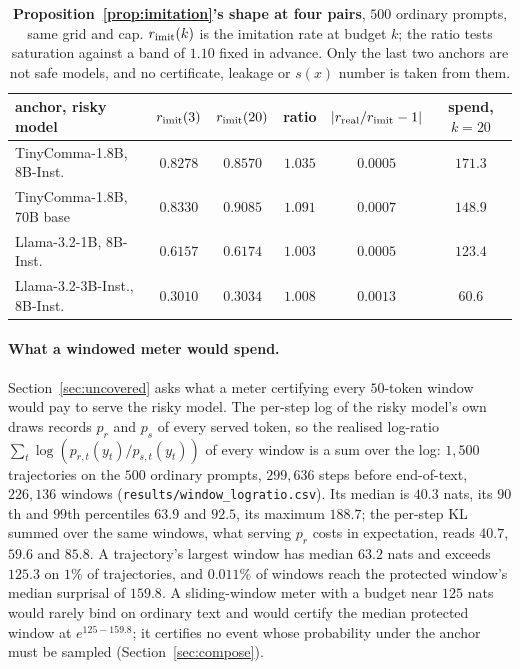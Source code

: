 \begin{table}[h]
\centering\footnotesize
\caption{\textbf{Proposition~\ref{prop:imitation}'s shape at four pairs}, $500$ ordinary prompts, same grid
and cap. $r_{\rm imit}(k)$ is the imitation rate at budget $k$; the ratio tests saturation against a band
of $1.10$ fixed in advance. Only the last two anchors are not safe models, and no certificate, leakage or
$s(x)$ number is taken from them.}
\label{tab:imitation-pairs}
\setlength{\tabcolsep}{4pt}
\begin{tabular}{@{}lccccc@{}}
\toprule
anchor, risky model & $r_{\rm imit}(3)$ & $r_{\rm imit}(20)$ & ratio & $|r_{\rm real}/r_{\rm imit}-1|$ & spend, $k{=}20$ \\
\midrule
TinyComma-1.8B, 8B-Inst.  & $0.8278$ & $0.8570$ & $1.035$ & $0.0005$ & $171.3$ \\
TinyComma-1.8B, 70B base  & $0.8330$ & $0.9085$ & $1.091$ & $0.0007$ & $148.9$ \\
Llama-3.2-1B, 8B-Inst.    & $0.6157$ & $0.6174$ & $1.003$ & $0.0005$ & $123.4$ \\
Llama-3.2-3B-Inst., 8B-Inst. & $0.3010$ & $0.3034$ & $1.008$ & $0.0013$ & $60.6$ \\
\bottomrule
\end{tabular}
\end{table}

\paragraph{What a windowed meter would spend.}\label{app:windowlr}
Section~\ref{sec:uncovered} asks what a meter certifying every $50$-token window would pay to serve the
risky model. The per-step log of the risky model's own draws records $p_r$ and $p_s$ of every served
token, so the realised log-ratio $\sum_t \log(p_{r,t}(y_t)/p_{s,t}(y_t))$ of every window is a sum over the
log: $1{,}500$ trajectories on the $500$ ordinary prompts, $299{,}636$ steps before end-of-text,
$226{,}136$ windows (\texttt{results/\allowbreak window\_\allowbreak logratio.csv}). Its median is $40.3$
nats, its $90$th and $99$th percentiles $63.9$ and $92.5$, its maximum $188.7$; the per-step KL summed
over the same windows, what serving $p_r$ costs in expectation, reads $40.7$, $59.6$ and $85.8$. A
trajectory's largest window has median $63.2$ nats and exceeds $125.3$ on $1\%$ of trajectories, and
$0.011\%$ of windows reach the protected window's median surprisal of $159.8$. A sliding-window meter
with a budget near $125$ nats would rarely bind on ordinary text and would certify the median protected
window at $e^{125-159.8}$; it certifies no event whose probability under the anchor must be sampled
(Section~\ref{sec:compose}).

